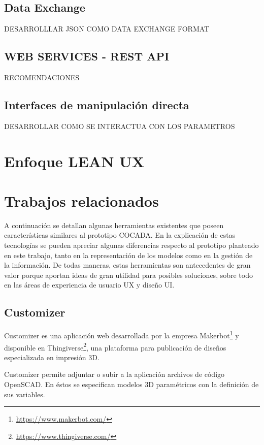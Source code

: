 \subsection{Data Exchange}

DESARROLLLAR JSON COMO DATA EXCHANGE FORMAT

\subsection{WEB SERVICES - REST API}
RECOMENDACIONES

\subsection{Interfaces de manipulación directa}

DESARROLLAR COMO SE INTERACTUA CON LOS PARAMETROS

\clearpage
\section{Enfoque LEAN UX}



\clearpage
\section{Trabajos relacionados}
A continuación se detallan algunas herramientas existentes que poseen características similares al prototipo COCADA. 
En la explicación de estas tecnologías se pueden apreciar algunas diferencias respecto al prototipo planteado en este trabajo, tanto en la representación de los modelos como en la gestión de la información. De todas maneras, estas herramientas son antecedentes de gran valor porque aportan ideas de gran utilidad para posibles soluciones, sobre todo en las áreas de experiencia de usuario UX y diseño UI.

\subsection{Customizer}
Customizer\citep{MakerBot2018} es una aplicación web desarrollada por la empresa Makerbot\footnote{\url{https://www.makerbot.com/}} y disponible en Thingiverse\footnote{\url{https://www.thingiverse.com/}}, una plataforma para publicación de diseños  especializada en impresión 3D.

Customizer permite adjuntar o subir a la aplicación archivos de código OpenSCAD. En éstos se especifican modelos 3D paramétricos con la definición de sus variables.

